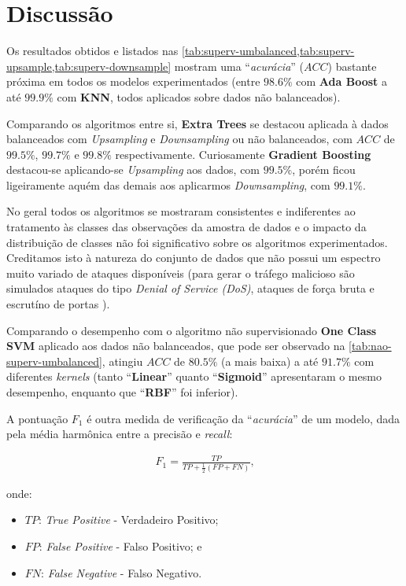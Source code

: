 \documentclass[twoside]{article}
\begin{document}
\section{Discussão}

Os resultados obtidos e listados nas \cref{tab:superv-umbalanced,tab:superv-upsample,tab:superv-downsample} mostram uma ``\textit{acurácia}'' ($ACC$) bastante próxima em todos os modelos experimentados (entre $98.6\%$ com \textbf{Ada Boost} a até $99.9\%$ com \textbf{KNN}, todos aplicados sobre dados não balanceados). 
    
Comparando os algoritmos entre si, \textbf{Extra Trees} se destacou aplicada à dados balanceados com \textit{Upsampling} e \textit{Downsampling} ou não balanceados, com $ACC$ de $99.5\%$, $99.7\%$ e $99.8\%$ respectivamente. Curiosamente \textbf{Gradient Boosting} destacou-se aplicando-se \textit{Upsampling} aos dados, com $99.5\%$, porém ficou ligeiramente aquém das demais aos aplicarmos \textit{Downsampling}, com $99.1\%$.

No geral todos os algoritmos se mostraram consistentes e indiferentes ao tratamento às classes das observações da amostra de dados e o impacto da distribuição de classes não foi significativo sobre os algoritmos experimentados. Creditamos isto à natureza do conjunto de dados que não possui um espectro muito variado de ataques disponíveis (para gerar o tráfego malicioso são simulados ataques do tipo \textit{Denial of Service (DoS)}, ataques de força bruta e escrutíno de portas \cite{ring2017creation,ring2017flow}).

Comparando o desempenho com o algoritmo não supervisionado \textbf{One Class SVM} aplicado aos dados não balanceados, que pode ser observado na \cref{tab:nao-superv-umbalanced}, atingiu $ACC$ de $80.5\%$ (a mais baixa) a até $91.7\%$ com diferentes \textit{kernels} (tanto ``\textbf{Linear}'' quanto ``\textbf{Sigmoid}'' apresentaram o mesmo desempenho, enquanto que ``\textbf{RBF}'' foi inferior).

A pontuação $F_1$ é outra medida de verificação da ``\textit{acurácia}'' de um modelo, dada pela média harmônica entre a precisão e \textit{recall}:

\begin{align*}
    F_1 = \frac{TP}{TP + \frac{1}{2}(FP + FN)} \text{,}
\end{align*}

\noindent onde:

\begin{itemize}
    \item $TP$: \textit{True Positive} - Verdadeiro Positivo;
    \item $FP$: \textit{False Positive} - Falso Positivo; e
    \item $FN$: \textit{False Negative} - Falso Negativo.
\end{itemize}
\end{document}
